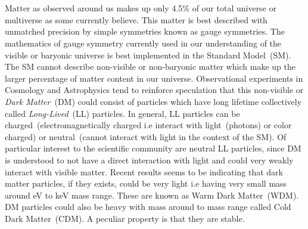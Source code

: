 \paragraph*{} \mbox{}\\
 Matter as observed around us makes up only 4.5\% of our total universe or multiverse as some currently believe. This matter is best described with unmatched precision by simple symmetries known as gauge symmetries. The mathematics of gauge symmetry currently used in our understanding of the visible or baryonic universe is best implemented in the Standard Model~(SM). The SM cannot describe non-visible or non-baryonic matter which make up the larger percentage of matter content in our universe. Observational experiments in Cosmology and Astrophysics  tend to reinforce speculation that this non-visible or \textit{Dark Matter}~(DM) could consist of particles which have long lifetime collectively called \textit{Long-Lived}~(LL) particles.  In general, LL particles can be charged~(electromagnetically charged i.e interact with light~(photons) or color charged) or neutral~(cannot interact with light in the context of the SM).
\newline
Of particular interest to the scientific community are neutral LL particles, since DM is understood to not have a direct interaction with light and could very weakly interact with visible matter.  Recent results seems to be indicating that dark matter particles, if they exists, could be very light i.e having very small mass around eV to keV mass range. These are known as Warm Dark Matter~(WDM). DM particles could also be heavy with mass around \GeV to \TeV mass range called Cold Dark Matter~(CDM). A peculiar property is that they are stable.
